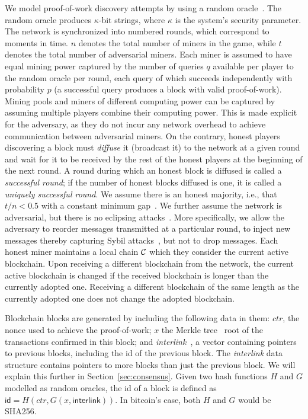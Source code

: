 We model proof-of-work discovery attempts by using a random oracle~\cite{RO}.
The random oracle produces $\kappa$-bit strings, where $\kappa$ is the system's
security parameter. The network is synchronized into numbered rounds, which
correspond to moments in time. $n$ denotes the total number of miners in the
game, while $t$ denotes the total number of adversarial miners. Each miner is
assumed to have equal mining power captured by the number of queries $q$
available per player to the random oracle per round, each query of which
succeeds independently with probability $p$ (a successful query produces a block
with valid proof-of-work). Mining pools and miners of different computing power
can be captured by assuming multiple players combine their computing power. This
is made explicit for the adversary, as they do not incur any network overhead to
achieve communication between adversarial miners. On the contrary, honest
players discovering a block must \emph{diffuse} it (broadcast it) to the
network at a given round and wait for it to be received by the rest of the
honest players at the beginning of the next round. A round during which an
honest block is diffused is called a \emph{successful round}; if the number of
honest blocks diffused is one, it is called a \emph{uniquely successful round}.
We assume there is an honest majority, i.e., that $t / n < 0.5$ with a constant
minimum gap~\cite{backbone}. We further assume the network is adversarial, but
there is no eclipsing attacks~\cite{heilman2015eclipse}. More specifically, we
allow the adversary to reorder messages transmitted at a particular round, to
inject new messages thereby capturing Sybil attacks~\cite{sybil}, but not to
drop messages. Each honest miner maintains a local chain $\mathcal{C}$ which they
consider the current active blockchain. Upon receiving a different blockchain
from the network, the current active blockchain is changed if the received
blockchain is longer than the currently adopted one. Receiving a different
blockchain of the same length as the currently adopted one does not change the
adopted blockchain.

Blockchain blocks are generated by including the following data in them: $ctr$,
the nonce used to achieve the proof-of-work; $x$ the Merkle tree~\cite{merkle}
root of the transactions confirmed in this block; and
\emph{interlink}~\cite{KLS}, a vector containing pointers to previous blocks,
including the id of the previous block. The \emph{interlink} data structure
contains pointers to more blocks than just the previous block. We will explain
this further in Section~\ref{sec:consensus}. Given two hash functions $H$ and
$G$ modelled as random oracles, the id of a block is defined as $\textsf{id} =
H(ctr, G(x, \textsf{interlink}))$. In bitcoin's case, both $H$ and $G$ would be
SHA256.


